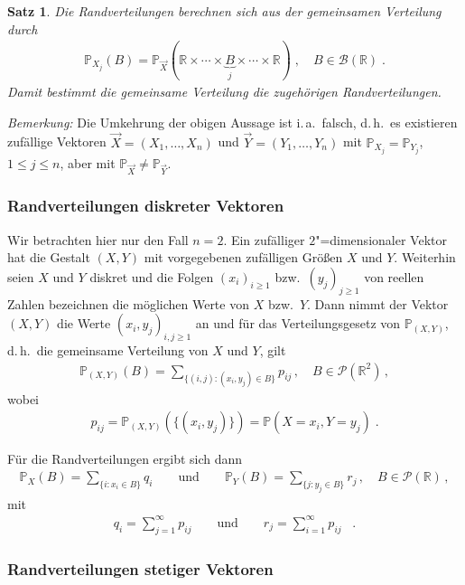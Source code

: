 \documentclass[ngerman,draft,parskip=half,twoside]{scrartcl}
\newtheorem{thm}{Satz}[section]
\newcommand*{\R}{\mathbb{R}}      %
\newcommand*{\BorelM}{\mathcal{B}}  %
\newcommand*{\PotM}{\mathcal{P}}    %
\newcommand*{\WKM}{\mathbb{P}}      %
\begin{document}
\begin{thm}
  Die Randverteilungen berechnen sich aus der gemeinsamen Verteilung durch
  \begin{gather*}
    \WKM_{X_j}(B)
       = \WKM_{\vec X}(\R\times\dotsb\times \underbrace{B}_j
       \times\dotsb\times\R)\;,\quad B\in\BorelM(\R)\;.
  \end{gather*}
  Damit bestimmt die gemeinsame Verteilung die zugehörigen Randverteilungen.
\end{thm}

\textit{Bemerkung:}
Die Umkehrung der obigen Aussage ist i.\,a.~falsch, d.\,h.~es existieren
zufällige Vektoren $\vec X=(X_1,\dotsc,X_n)$ und $\vec Y=(Y_1,\dotsc, Y_n)$ mit
$\WKM_{X_j}=\WKM_{Y_j}$, $1\le j\le n$, aber mit $\WKM_{\vec X}\not=\WKM_{\vec
Y}$.

\subsubsection{Randverteilungen diskreter Vektoren}
\label{disk}

Wir betrachten hier nur den Fall $n=2$. Ein zufälliger $2$"=dimensionaler
Vektor hat die Gestalt $(X,Y)$ mit vorgegebenen zufälligen Größen $X$ und $Y$.
Weiterhin seien $X$ und $Y$ diskret und die Folgen $(x_i)_{i\ge 1}$
bzw.~$(y_j)_{j\ge 1}$ von reellen Zahlen bezeichnen die möglichen Werte von $X$
bzw.~$Y$. Dann nimmt der Vektor $(X,Y)$ die Werte $(x_i,y_j)_{i,j\ge 1}$ an und
für das Verteilungsgesetz von $\WKM_{(X,Y)}$, d.\,h.~die gemeinsame Verteilung
von $X$ und $Y$, gilt
\begin{gather*}
  \WKM_{(X,Y)}(B)
     =\sum_{\{(i,j)\colon (x_i,y_j)\in B\}} p_{ij}\,,\quad B\in\PotM(\R^2)\,,
\end{gather*}
wobei
\begin{gather*}
  p_{ij}= \WKM_{(X,Y)}(\{(x_i,y_j)\})=\WKM(X=x_i,Y=y_j)\;.
\end{gather*}

Für die Randverteilungen ergibt sich dann
\begin{gather*}
  \WKM_X(B)=\sum_{\{i\colon x_i\in B\}} q_i \qquad\mbox{und}\qquad
     \WKM_Y(B)=\sum_{\{j\colon y_j\in B\}} r_j\,,\quad B\in\PotM(\R)\,,
\end{gather*}
mit
\begin{gather*}
  q_i
     =\sum_{j=1}^\infty p_{ij}
     \qquad\mbox{und}\qquad
     r_j=\sum_{i=1}^\infty p_{ij}\;\;\;.
\end{gather*}

\subsubsection{Randverteilungen stetiger Vektoren}
\label{stet}
\end{document}
